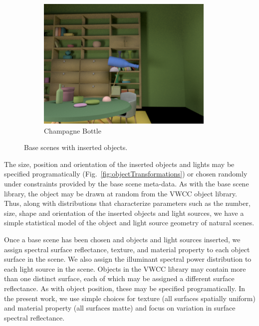 \documentclass{jov}
\begin{document}
\begin{figure}[h]
\begin{subfigure}[b]{0.22 \textwidth}
        \includegraphics[width=\textwidth]{Figure12/libraryWithChampagneBottle.png}
        \caption{Champagne Bottle}
        \label{fig:libraryWithChampagneBottle}
    \end{subfigure}
\caption{Base scenes with inserted objects.}\label{fig:libraryWithTarget}
\end{figure}

The size, position and orientation of the inserted objects and lights may be specified programatically (Fig.~\ref{fig:objectTransformations}) or chosen randomly under constraints provided by the base scene meta-data. As with the base scene library, the object may be drawn at random from the VWCC object library.  Thus, along with distributions that characterize parameters such as the number, size, shape and orientation of the inserted objects and light sources, we have a simple statistical model of the object and light source geometry of natural scenes. 

Once a base scene has been chosen and objects and light sources inserted, we assign spectral surface reflectance, texture, and material property to each object surface in the scene. We also assign the illuminant spectral power distribution to each light source in the scene. Objects in the VWCC library may contain more than one distinct surface, each of which may be assigned a different surface reflectance. As with object position, these may be specified programatically. In the present work, we use simple choices for texture (all surfaces spatially uniform) and material property (all surfaces matte) and focus on variation in surface spectral reflectance. 
\end{document}
